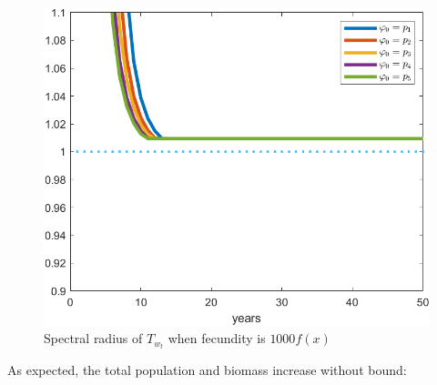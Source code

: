 \begin{figure}[H]
	\centering
	\includegraphics[width=0.7\linewidth]{Images/F=1000/spectral_radius_when_f=1000}
	\caption{Spectral radius of $T_{w_t}$ when fecundity is $1000f(x)$}
	\label{fig:spectralradiuswhenf=1000}
\end{figure}

As expected, the total population and biomass increase without bound:

